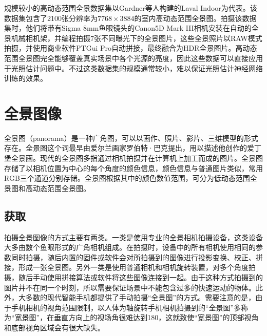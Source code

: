 规模较小的高动态范围全景数据集以Gardner等人构建的Laval Indoor\cite{gardner2017learning}为代表。该数据集包含了2100张分辨率为$7768\times3884$的室内高动态范围全景图。拍摄该数据集时，他们将带有Sigma 8mm鱼眼镜头的Canon5D Mark III相机安装在自动的全景机械相机架，并编程拍摄7张不同曝光下的全景图片，这些全景照片以RAW模式拍摄，并使用商业软件PTGui Pro\cite{ptgui}自动拼接，最终融合为HDR全景图片。高动态范围全景图完全能够覆盖真实场景中各个光源的亮度，因此这些数据可以直接应用于光照估计问题中。不过这类数据集的规模通常较小，难以保证光照估计神经网络训练的效果。

\section{全景图像}
全景图（panorama）是一种广角图，可以以画作、照片、影片、三维模型的形式存在。全景图这个词最早由爱尔兰画家罗伯特·巴克提出，用以描述他创作的爱丁堡全景画。现代的全景图多指通过相机拍摄并在计算机上加工而成的图片\cite{wikipedia}。全景图存储了以相机位置为中心的每个角度的颜色信息，颜色信息与普通图片类似，常用RGB三个通道分别存储。全景图根据其中的颜色数值范围，可分为低动态范围全景图和高动态范围全景图。

\subsection{获取}
拍摄全景图像的方式主要有两类。一类是使用专业的全景相机拍摄设备，这类设备大多由数个鱼眼形式的广角相机组成。在拍摄时，设备中的所有相机使用相同的参数同时拍摄，随后内置的固件或软件会对所拍摄到的图像进行投影变换、校正、拼接，形成一张全景图。另外一类是使用普通相机和相机旋转装置，对多个角度拍摄，随后手动使用拼接算法或软件将这些图像连接到一起。由于这种方式拍摄到的图片并不在同一个时刻，所以需要保证场景中不能包含过多的快速运动的物体。此外，大多数的现代智能手机都提供了手动拍摄“全景图”的方式。需要注意的是，由于手机相机的视角范围限制，以人体为轴旋转手机相机拍摄到的“全景图”多称为“宽景图”，在垂直方向上的视场角很难达到180\doge，这就致使“宽景图”的顶部视角和底部视角区域会有很大缺失。

